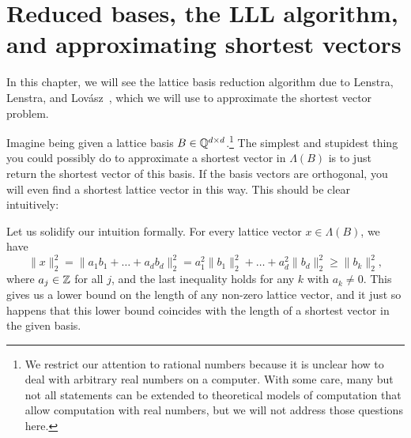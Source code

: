 %
% 
%

\chapter{Reduced bases, the LLL algorithm, and approximating shortest vectors}
\label{chapter:basis-reduction-LLL}

In this chapter, we will see the lattice basis reduction algorithm due to
Lenstra, Lenstra, and Lovász~\cite{MR682664}, which we will use to approximate the shortest
vector problem.

Imagine being given a lattice basis $B \in \mathbb{Q}^{d \times d}$.\footnote{We
restrict our attention to rational numbers because it is unclear how to deal with arbitrary real numbers
on a computer. With some care, many but not all statements can be extended to theoretical models of computation
that allow computation with real numbers, but we will not address those questions here.}
The simplest and stupidest thing you could possibly do to approximate a shortest vector in $\Lambda(B)$
is to just return the shortest vector of this basis.
If the basis vectors are orthogonal, you will even find a shortest lattice vector
in this way.
This should be clear intuitively:
\begin{center}
\end{center}
Let us solidify our intuition formally.
For every lattice vector $x \in \Lambda(B)$,
we have
\[
  \|x\|_2^2 = \|a_1b_1 + \dots + a_db_d\|_2^2 = a_1^2 \|b_1\|_2^2 + \dots + a_d^2 \|b_d\|_2^2 \geq \|b_k\|_2^2,
\]
where $a_j \in \mathbb{Z}$ for all $j$,
and the last inequality holds for any $k$ with $a_k \neq 0$.
This gives us a lower bound on the length of any non-zero lattice vector,
and it just so happens that this lower bound coincides with the length of a shortest vector in the given basis.

